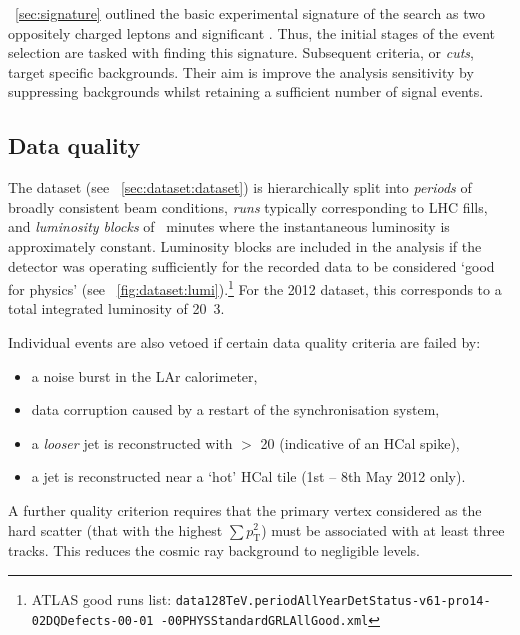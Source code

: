 
\Section~\ref{sec:signature} outlined the basic experimental signature of the search as 
two oppositely charged leptons and significant \met. Thus, the initial stages of the 
event selection are tasked with finding this signature. Subsequent criteria, or 
\textit{cuts}, target specific backgrounds. Their aim is improve the analysis sensitivity 
by suppressing backgrounds whilst retaining a sufficient number of signal events.



\subsection{Data quality}
\label{sec:selection:quality}

The \pp dataset (see \Section~\ref{sec:dataset:dataset}) is hierarchically split into 
\textit{periods} of broadly consistent beam conditions, \textit{runs} typically 
corresponding to LHC fills, and \textit{luminosity blocks} of ~minutes where the 
instantaneous luminosity is approximately constant. Luminosity blocks are included in the 
analysis if the detector was operating sufficiently for the recorded data to be 
considered `good for physics' (see \Figure~\ref{fig:dataset:lumi}).\footnote{
	ATLAS good runs list: \texttt{data128TeV.periodAllYearDetStatus-v61-pro14-02DQDefects-00-01
	-00PHYSStandardGRLAllGood.xml}
} 
For the 2012 dataset, this corresponds to a total integrated luminosity of 
\unit{20.3}{\invfb}.

Individual events are also vetoed if certain data quality criteria are failed by:
\begin{itemize}[noitemsep,nolistsep]
	\item a noise burst in the LAr calorimeter,
	\item data corruption caused by a restart of the synchronisation system,
	\item a \textit{looser} jet is reconstructed with \pt $>$ \unit{20}{\GeV} (indicative of an HCal spike),
	\item a jet is reconstructed near a `hot' HCal tile (1st -- 8th May 2012 only).
\end{itemize}
A further quality criterion requires that the primary vertex considered as the hard 
scatter (that with the highest $\sum p_{\text{T}}^2$) must be associated with at least 
three tracks. This reduces the cosmic ray background to negligible levels.



